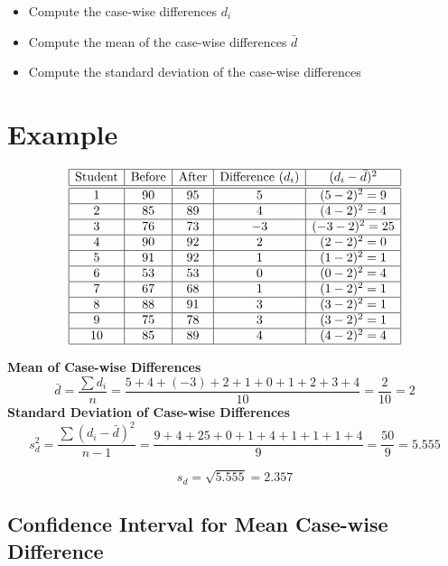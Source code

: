 \documentclass[a4paper,12pt]{article}
\begin{document}
\begin{framed}
\begin{itemize}
\item Compute the case-wise differences $d_i$
\item Compute the mean of the case-wise differences $\bar{d}$
\item Compute the standard deviation of the case-wise differences
\end{itemize}
\end{framed}


\section*{Example}

\[
\begin{array}{|c|c|c|c|c|} \hline 
\mbox{Student} & \mbox{Before} & \mbox{After} & \mbox{Difference }(d_i) & (d_i - \bar{d})^2 \\ \hline \hline 
1 & 90 & 95 & 5 & (5-2)^2 = 9 \\ \hline 
2 & 85 & 89 & 4 & (4-2)^2 = 4 \\ \hline 
3 & 76 & 73 & -3 & (-3-2)^2 = 25 \\ \hline 
4 & 90 & 92 & 2 & (2-2)^2 =  0 \\ \hline 
5 & 91 & 92 & 1 & (1-2)^2 =  1 \\ \hline 
6 & 53 & 53 & 0 & (0-2)^2 = 4 \\ \hline 
7 & 67 & 68 & 1 & (1-2)^2 =  1 \\ \hline 
8 & 88 & 91 & 3 & (3-2)^2 = 1 \\ \hline 
9 & 75 & 78 & 3 & (3-2)^2 = 1 \\ \hline 
10 & 85 & 89 & 4 & (4-2)^2 = 4 \\ \hline 
\end{array} 
\]
\newpage

\noindent \textbf{Mean of Case-wise Differences}
\[\bar{d} = \frac{\sum d_i}{n} = \frac{5+4+(-3)+2+1+0+1+2+3+4}{10} = \frac{2}{10} = 2\]
\smallskip
\noindent \textbf{Standard Deviation of Case-wise Differences}
\[s_d^2  = \frac{\sum (d_i-\bar{d})^2}{n-1} = \frac{9+4+25+0+1+4+1+1+1+4}{9} = \frac{50}{9} = 5.555\] \smallskip

\[s_d = \sqrt{5.555} =   2.357 \]
\subsection*{Confidence Interval for Mean Case-wise Difference}
\end{document}
